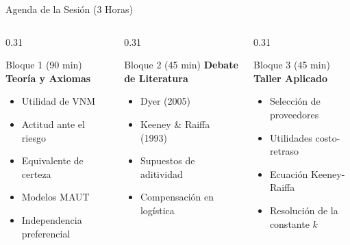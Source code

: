 \documentclass[aspectratio=169, 10pt]{beamer}
\begin{document}
\begin{frame}{Agenda de la Sesión (3 Horas)}
    \begin{columns}[T]
        \begin{column}{0.31\textwidth}
            \begin{block}{Bloque 1 (90 min)}
                \textbf{Teoría y Axiomas}
                \begin{itemize}
                    \scriptsize
                    \item Utilidad de VNM
                    \item Actitud ante el riesgo
                    \item Equivalente de certeza
                    \item Modelos MAUT
                    \item Independencia preferencial
                \end{itemize}
            \end{block}
        \end{column}
        
        \begin{column}{0.31\textwidth}
            \begin{exampleblock}{Bloque 2 (45 min)}
                \textbf{Debate de Literatura}
                \begin{itemize}
                    \scriptsize
                    \item Dyer (2005)
                    \item Keeney \& Raiffa (1993)
                    \item Supuestos de aditividad
                    \item Compensación en logística
                \end{itemize}
            \end{exampleblock}
        \end{column}
        
        \begin{column}{0.31\textwidth}
            \begin{alertblock}{Bloque 3 (45 min)}
                \textbf{Taller Aplicado}
                \begin{itemize}
                    \scriptsize
                    \item Selección de proveedores
                    \item Utilidades costo-retraso
                    \item Ecuación Keeney-Raiffa
                    \item Resolución de la constante $k$
                \end{itemize}
            \end{alertblock}
        \end{column}
    \end{columns}
\end{frame}
\end{document}
